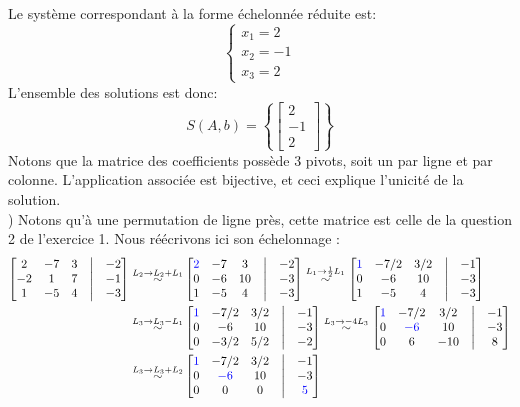 \documentclass{article}
\begin{document}
Le système correspondant à la forme échelonnée réduite est:
$$\begin{cases}
x_1 = 2 \\
x_2 = -1 \\
x_3 = 2
\end{cases}$$
L'ensemble des solutions est donc:
$$S(A,b) = \left\{ \begin{bmatrix} 2 \\ -1 \\ 2 \end{bmatrix} \right\}$$
Notons que la matrice des coefficients possède 3 pivots, soit un par ligne et par colonne. L'application associée est bijective, et ceci explique l'unicité de la solution. \\

) Notons qu'à une permutation de ligne près, cette matrice est celle de la question 2 de l'exercice 1. Nous réécrivons ici son échelonnage :\begin{align*}
    \begin{bmatrix}
    2 & -7 & 3 & \bigm| & -2 \\
    -2 & 1 & 7 & \bigm| & -1 \\
    1 & -5 & 4 & \bigm| & -3
    \end{bmatrix}
    \overset{L_2 \rightarrow L_2 +L_1}{\sim}
    &\begin{bmatrix}
    \color{blue}2 & -7 & 3 & \bigm| & -2 \\
    0 & -6 & 10 & \bigm| & -3 \\
    1 & -5 & 4 & \bigm| & -3
    \end{bmatrix}
    \overset{L_1 \rightarrow \frac{1}{2}L_1}{\sim}
    \begin{bmatrix}
   \color{blue} 1 & -7/2 & 3/2 & \bigm| & -1 \\
    0 & -6 & 10 & \bigm| & -3 \\
    1 & -5 & 4 & \bigm| & -3
    \end{bmatrix} \\
    \overset{L_3 \rightarrow L_3 - L_1}{\sim}
    &\begin{bmatrix}
    \color{blue}1 & -7/2 & 3/2 & \bigm| & -1 \\
    0 & -6 & 10 & \bigm| & -3 \\
    0 & -3/2 & 5/2 & \bigm| & -2
    \end{bmatrix}
    \overset{L_3 \rightarrow -4L_3}{\sim}
    \begin{bmatrix}
    \color{blue}1 & -7/2 & 3/2 & \bigm| & -1 \\
    0 &\color{blue} -6 & 10 & \bigm| & -3 \\
    0 & 6 & -10 & \bigm| & 8 %
    \end{bmatrix} \\
    \overset{L_3 \rightarrow L_3+L_2}{\sim}
    &\begin{bmatrix}
    \color{blue}1 & -7/2 & 3/2 & \bigm| & -1 \\
    0 & \color{blue}-6 & 10 & \bigm| & -3 \\
    0 & 0 & 0 & \bigm| & \color{blue}5
    \end{bmatrix}
\end{align*}
\end{document}
